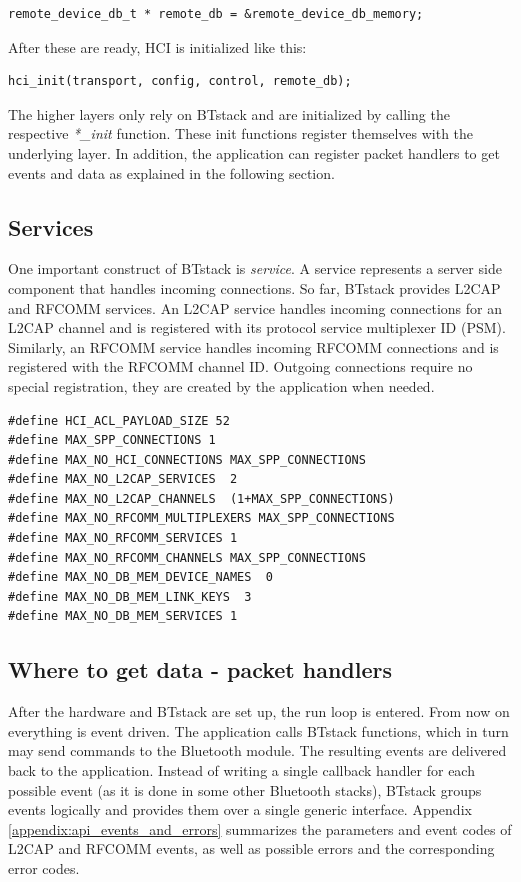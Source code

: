 \documentclass[a4paper,titlepage,oneside,12pt]{amsart} %
\begin{document}
\begin{lstlisting}
remote_device_db_t * remote_db = &remote_device_db_memory;
\end{lstlisting}


After these are ready, HCI is initialized like this:
\begin{lstlisting}
hci_init(transport, config, control, remote_db);
\end{lstlisting}

The higher layers only rely on BTstack and are initialized by calling the respective \emph{*\_init} function. These init functions register themselves with the underlying layer. In addition, the application can register packet handlers to get events and data as explained in the following section.


\subsection{Services}
One important construct of BTstack is \emph{service}. A service represents a server side component that handles incoming connections. So far, BTstack provides L2CAP and RFCOMM services. An L2CAP service handles incoming connections for an L2CAP channel and is registered with its protocol service multiplexer ID (PSM). Similarly,  an RFCOMM service handles incoming RFCOMM connections and is registered with the RFCOMM channel ID. Outgoing connections require no special registration, they are created by the application when needed. 

\begin{lstlisting}[float, caption=Memory configuration for an SPP service with a minimal L2CAP MTU., label=memoryConfigurationSPP]
#define HCI_ACL_PAYLOAD_SIZE 52
#define MAX_SPP_CONNECTIONS 1
#define MAX_NO_HCI_CONNECTIONS MAX_SPP_CONNECTIONS
#define MAX_NO_L2CAP_SERVICES  2
#define MAX_NO_L2CAP_CHANNELS  (1+MAX_SPP_CONNECTIONS)
#define MAX_NO_RFCOMM_MULTIPLEXERS MAX_SPP_CONNECTIONS
#define MAX_NO_RFCOMM_SERVICES 1
#define MAX_NO_RFCOMM_CHANNELS MAX_SPP_CONNECTIONS
#define MAX_NO_DB_MEM_DEVICE_NAMES  0
#define MAX_NO_DB_MEM_LINK_KEYS  3
#define MAX_NO_DB_MEM_SERVICES 1
\end{lstlisting}

\subsection{Where to get data - packet handlers}
\label{section:packetHandlers}

After the hardware and BTstack are set up, the run loop is entered. From now on everything is event driven. The application calls BTstack functions, which in turn may send commands to the Bluetooth module. The resulting events are delivered back to the application. Instead of writing a single callback handler for each possible event (as it is done in some other Bluetooth stacks), BTstack groups events logically and provides them over a single generic interface.  Appendix \ref{appendix:api_events_and_errors} summarizes the parameters and event codes of L2CAP and RFCOMM events, as well as possible errors and the corresponding error codes.
\end{document}
